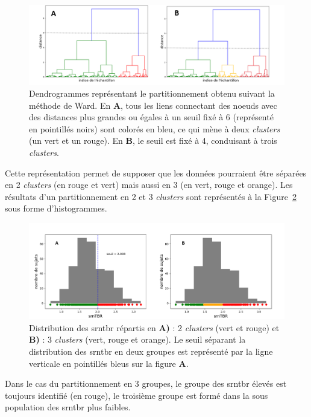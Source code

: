 \begin{figure}[h!]
  \centering
	\includegraphics[width=1\linewidth]{figures/chapter-4/tbr-dendrogram-ward} 
  \caption{Dendrogrammes représentant le partitionnement obtenu suivant la méthode de Ward. En \textbf{A}, tous les liens connectant des noeuds 
	avec des distances plus grandes ou égales à un seuil fixé à 6 (représenté en pointillés noirs) sont colorés en bleu, ce qui mène à deux \textit{clusters}	
	(un vert et un rouge). En \textbf{B}, le seuil est fixé à 4, conduisant à trois \textit{clusters}.}
  \label{Figure:tbr_ward_dendrogram}
\end{figure}

Cette représentation permet de supposer que les données pourraient être séparées en 2 \textit{clusters} (en rouge et vert) 
mais aussi en 3 (en vert, rouge et orange). Les résultats d'un partitionnement en 2 et 3 \textit{clusters} sont représentés 
à la Figure~\ref{Figure:tbr_ward_histograms} sous forme d'histogrammes.

\begin{figure}[h!]
  \centering
	\includegraphics[width=1.0\linewidth]{figures/chapter-4/tbr-histogram-ward} 
  \caption{Distribution des \gls{srntbr} répartis en \textbf{A)} : 2 \textit{clusters} (vert et rouge) et \textbf{B)} : 3 \textit{clusters} 
	(vert, rouge et orange). Le seuil séparant la distribution des \gls{srntbr} en deux groupes est représenté par la ligne verticale en pointillés bleus sur la 
	figure \textbf{A}.}
  \label{Figure:tbr_ward_histograms}
\end{figure}

Dans le cas du partitionnement en 3 groupes, le groupe des \gls{srntbr} élevés est toujours identifié (en rouge), le troisième groupe est formé dans 
la sous population des \gls{srntbr} plus faibles. 

